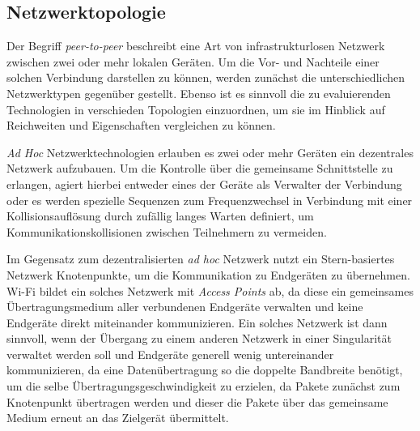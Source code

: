     
    
    \subsection{Netzwerktopologie}
    
    Der Begriff {\it peer-to-peer} beschreibt eine Art von infrastrukturlosen Netzwerk zwischen zwei oder mehr lokalen Geräten. Um die Vor- und Nachteile einer solchen Verbindung darstellen zu können, werden zunächst die unterschiedlichen Netzwerktypen gegenüber gestellt. Ebenso ist es sinnvoll die zu evaluierenden Technologien in verschieden Topologien einzuordnen, um sie im Hinblick auf Reichweiten und Eigenschaften vergleichen zu können.
    
    {\it Ad Hoc} Netzwerktechnologien erlauben es zwei oder mehr Geräten ein dezentrales Netzwerk aufzubauen. Um die Kontrolle über die gemeinsame Schnittstelle zu erlangen, agiert hierbei entweder eines der Geräte als Verwalter der Verbindung oder es werden spezielle Sequenzen zum Frequenzwechsel in Verbindung mit einer Kollisionsauflösung durch zufällig langes Warten definiert, um Kommunikationskollisionen zwischen Teilnehmern zu vermeiden.
    
    Im Gegensatz zum dezentralisierten {\it ad hoc} Netzwerk nutzt ein Stern-basiertes Netzwerk Knotenpunkte, um die Kommunikation zu Endgeräten zu übernehmen. Wi-Fi bildet ein solches Netzwerk mit {\it Access Points} ab, da diese ein gemeinsames Übertragungsmedium aller verbundenen Endgeräte verwalten und keine Endgeräte direkt miteinander kommunizieren. Ein solches Netzwerk ist dann sinnvoll, wenn der Übergang zu einem anderen Netzwerk in einer Singularität verwaltet werden soll und Endgeräte generell wenig untereinander kommunizieren, da eine Datenübertragung so die doppelte Bandbreite benötigt, um die selbe Übertragungsgeschwindigkeit zu erzielen, da Pakete zunächst zum Knotenpunkt übertragen werden und dieser die Pakete über das gemeinsame Medium erneut an das Zielgerät übermittelt.

